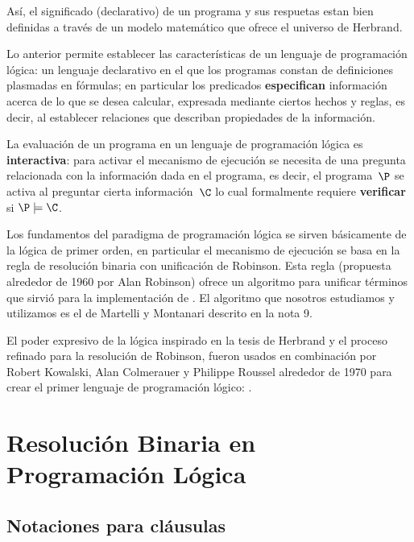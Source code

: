 \documentclass[11pt,letterpaper]{article}
\begin{document}
As\'i, el significado (declarativo) de un programa y sus respuetas estan bien 
definidas a trav\'es de un modelo matem\'atico que ofrece el universo de 
Herbrand.

\medskip

Lo anterior permite establecer las caracter\'isticas de un lenguaje de 
programación lógica: un lenguaje declarativo en el que los 
programas constan de definiciones plasmadas en f\'ormulas; en particular los predicados \textbf{especifican} información acerca de lo que 
se desea calcular, expresada mediante ciertos hechos y reglas, es decir, al 
establecer relaciones que describan propiedades de la informaci\'on. 

La evaluación de un programa en un lenguaje de programaci\'on l\'ogica es 
\textbf{interactiva}: para activar el mecanismo de ejecución se necesita de una 
pregunta relacionada con la información dada en el programa, es decir, el 
programa~$\P$ se activa al preguntar cierta información~$\C$ lo cual formalmente 
requiere \textbf{verificar} si $\P\models\C$.

Los fundamentos del paradigma de programación lógica se sirven básicamente de 
la lógica de primer orden, en particular el mecanismo de ejecución se basa en 
la regla de resolución binaria con unificación de Robinson. 
Esta regla (propuesta alrededor de 1960 por Alan Robinson) ofrece un algoritmo 
para unificar t\'erminos que sirvi\'o para la implementaci\'on de {\pl}.
El algoritmo que nosotros estudiamos y utilizamos es el de Martelli y Montanari 
descrito en la nota 9. 


El poder expresivo de la l\'ogica inspirado en la tesis de Herbrand y 
el proceso refinado para la resolución de Robinson, fueron usados en 
combinaci\'on por Robert Kowalski, Alan Colmerauer y Philippe Roussel alrededor 
de 1970 para crear el primer lenguaje de programaci\'on l\'ogico: {\pl}.



\section{Resolución Binaria en Programación Lógica}

\subsection{Notaciones para cláusulas}
\end{document}
